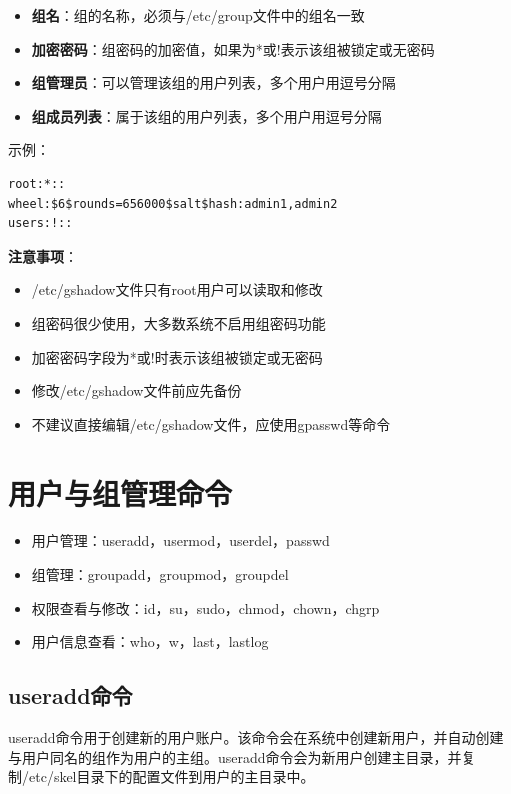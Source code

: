 \documentclass[12pt,UTF8]{ctexbook}
\begin{document}
\begin{itemize}
    \item \textbf{组名}：组的名称，必须与/etc/group文件中的组名一致
    \item \textbf{加密密码}：组密码的加密值，如果为*或!表示该组被锁定或无密码
    \item \textbf{组管理员}：可以管理该组的用户列表，多个用户用逗号分隔
    \item \textbf{组成员列表}：属于该组的用户列表，多个用户用逗号分隔
\end{itemize}

示例：

\begin{verbatim}
root:*::
wheel:$6$rounds=656000$salt$hash:admin1,admin2
users:!::
\end{verbatim}

\textbf{注意事项}：
\begin{itemize}
    \item /etc/gshadow文件只有root用户可以读取和修改
    \item 组密码很少使用，大多数系统不启用组密码功能
    \item 加密密码字段为*或!时表示该组被锁定或无密码
    \item 修改/etc/gshadow文件前应先备份
    \item 不建议直接编辑/etc/gshadow文件，应使用gpasswd等命令
\end{itemize}

\section{用户与组管理命令}
\begin{itemize}
    \item 用户管理：useradd，usermod，userdel，passwd
    \item 组管理：groupadd，groupmod，groupdel
    \item 权限查看与修改：id，su，sudo，chmod，chown，chgrp
    \item 用户信息查看：who，w，last，lastlog
\end{itemize}

\subsection{useradd命令}
useradd命令用于创建新的用户账户。该命令会在系统中创建新用户，并自动创建与用户同名的组作为用户的主组。useradd命令会为新用户创建主目录，并复制/etc/skel目录下的配置文件到用户的主目录中。
\end{document}
